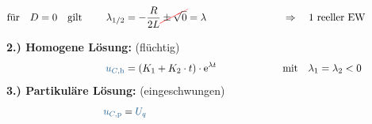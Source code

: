 \begin{frame}[t]
\begin{align*}
    \vphantom{\sqrt{\left(\frac{R}{2L}\right)^2}}
    &\text{für}\quad D = 0 \quad\text{gilt}&
        \lambda_{1/2} &= -\frac{R}{2L} \redcancel{ {} \pm {} \sqrt{0}} = \lambda
            &&\Rightarrow\quad \text{1 reeller EW}
    \\[-15pt] &\hphantom{1rrrrrrrrrrrrrrrr} &   \hphantom{2llllll}&\hphantom{\mathrel{\phantom{=}}2rrrrrrrrrrrrrrrrrrrrrrrrrrr}     &&\hphantom{3rrrrrrrrrrrrrrrrrrrrrrrr} \nonumber
\end{align*}%
\pause%
\textbf{2.) Homogene Lösung:} (flüchtig)
\begin{align}
    &&
        \ecv{u_{C,\mathrm{h}}} &= \left( K_1 + K_2 \cdot t \right) \cdot \mathrm{e}^{\lambda t}
    &&\text{mit}\quad \lambda_1 = \lambda_2 < 0  \label{eq:dgl:rlc:homolsg:grenzfall}
    \\[-15pt] &\hphantom{1rrrrrrrrrrrrrrrr} &   \hphantom{2llllll}&\hphantom{\mathrel{\phantom{=}}2rrrrrrrrrrrrrrrrrrrrrrrrrrr}     &&\hphantom{3rrrrrrrrrrrrrrrrrrrrrrrr} \nonumber
\end{align}%
\textbf{3.) Partikuläre Lösung:} (eingeschwungen)%
\begin{align*}
    &&
        \ecv{u_{C,\mathrm{p}}} &= \ecv{U_q}
    \\[-15pt] &\hphantom{1rrrrrrrrrrrrrrrr} &   \hphantom{2llllll}&\hphantom{\mathrel{\phantom{=}}2rrrrrrrrrrrrrrrrrrrrrrrrrrr}     &&\hphantom{3rrrrrrrrrrrrrrrrrrrrrrrr} \nonumber
    \end{align*}
\end{frame}



